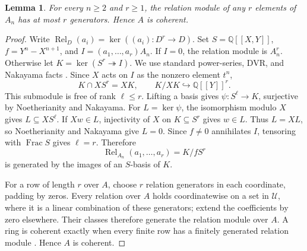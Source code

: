 \documentclass[11pt,reqno]{amsart}
\numberwithin{equation}{section}
\theoremstyle{plain}
\newtheorem{lemma}[theorem]{Lemma}
\DeclareMathOperator{\Frac}{Frac}
\newcommand{\QQ}{\mathbb Q}
\newcommand{\UU}{\mathcal U}
\begin{document}
\begin{lemma}\label{lem:uniform}
For every $n\geq2$ and $r\geq1$, the relation module of any $r$
elements of $A_n$ has at most $r$ generators. Hence $A$ is coherent.
\end{lemma}
\begin{proof}
Write $\operatorname{Rel}_D(a_i)=\ker((a_i):D^r\to D)$.
Set $S=\QQ[[X,Y]]$, $f=Y^n-X^{n+1}$, and
$I=(a_1,\ldots,a_r)A_n$. If $I=0$, the relation module is $A_n^r$.
Otherwise let $K=\ker(S^r\twoheadrightarrow I)$.
We use standard power-series, DVR, and Nakayama facts
\cite[Tags~0306, 0AUW, 00DV]{StacksProject}.
Since $X$ acts on $I$ as the nonzero element $t^n$,
\[
 K\cap XS^r=XK,\qquad K/XK\hookrightarrow\QQ[[Y]]^r.
\]
This submodule is free of rank $\ell\leq r$. Lifting a basis gives
$\psi:S^\ell\to K$, surjective by Noetherianity and Nakayama.
For $L=\ker\psi$, the isomorphism modulo $X$ gives $L\subseteq XS^\ell$.
If $Xw\in L$, injectivity of $X$ on $K\subseteq S^r$ gives $w\in L$.
Thus $L=XL$, so Noetherianity and Nakayama give $L=0$.
Since $f\ne0$ annihilates $I$, tensoring with $\Frac S$ gives
$\ell=r$. Therefore
\[
 \operatorname{Rel}_{A_n}(a_1,\ldots,a_r)=K/fS^r
\]
is generated by the images of an $S$-basis of $K$.

For a row of length $r$ over $A$, choose $r$ relation generators in
each coordinate, padding by zeros. Every relation over $A$ holds
coordinatewise on a set in $\UU$, where it is a linear combination
of these generators; extend the coefficients by zero elsewhere.
Their classes therefore generate the relation module over $A$.
A ring is coherent exactly when every finite row has a finitely
generated relation module
\cite[\S10.90]{StacksProject}. Hence $A$ is coherent.
\end{proof}
\end{document}
